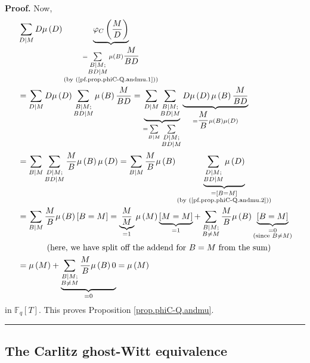\documentclass[numbers=enddot,12pt,final,onecolumn,notitlepage]{scrartcl}%
\theoremstyle{definition}
\newenvironment{proof}[1][Proof]{\noindent\textbf{#1.} }{\ \rule{0.5em}{0.5em}}
\let\sumnonlimits\sum
\renewcommand{\sum}{\sumnonlimits\limits}
\begin{document}
\begin{proof}
Now,%
\begin{align*}
&  \sum_{D\mid M}D\mu\left(  D\right)  \underbrace{\varphi_{C}\left(
\dfrac{M}{D}\right)  }_{\substack{=\sum_{\substack{B\mid M;\\BD\mid M}%
}\mu\left(  B\right)  \dfrac{M}{BD}\\\text{(by (\ref{pf.prop.phiC-Q.andmu.1}%
))}}}\\
&  =\sum_{D\mid M}D\mu\left(  D\right)  \sum_{\substack{B\mid M;\\BD\mid
M}}\mu\left(  B\right)  \dfrac{M}{BD}=\underbrace{\sum_{D\mid M}%
\sum_{\substack{B\mid M;\\BD\mid M}}}_{=\sum_{B\mid M}\sum_{\substack{D\mid
M;\\BD\mid M}}}\underbrace{D\mu\left(  D\right)  \mu\left(  B\right)
\dfrac{M}{BD}}_{=\dfrac{M}{B}\mu\left(  B\right)  \mu\left(  D\right)  }\\
&  =\sum_{B\mid M}\sum_{\substack{D\mid M;\\BD\mid M}}\dfrac{M}{B}\mu\left(
B\right)  \mu\left(  D\right)  =\sum_{B\mid M}\dfrac{M}{B}\mu\left(  B\right)
\underbrace{\sum_{\substack{D\mid M;\\BD\mid M}}\mu\left(  D\right)
}_{\substack{=\left[  B=M\right]  \\\text{(by (\ref{pf.prop.phiC-Q.andmu.2}%
))}}}\\
&  =\sum_{B\mid M}\dfrac{M}{B}\mu\left(  B\right)  \left[  B=M\right]
=\underbrace{\dfrac{M}{M}}_{=1}\mu\left(  M\right)  \underbrace{\left[
M=M\right]  }_{=1}+\sum_{\substack{B\mid M;\\B\neq M}}\dfrac{M}{B}\mu\left(
B\right)  \underbrace{\left[  B=M\right]  }_{\substack{=0\\\text{(since }B\neq
M\text{)}}}\\
&  \ \ \ \ \ \ \ \ \ \ \left(  \text{here, we have split off the addend for
}B=M\text{ from the sum}\right) \\
&  =\mu\left(  M\right)  +\underbrace{\sum_{\substack{B\mid M;\\B\neq
M}}\dfrac{M}{B}\mu\left(  B\right)  0}_{=0}=\mu\left(  M\right)
\end{align*}
in $\mathbb{F}_{q}\left[  T\right]  $. This proves Proposition
\ref{prop.phiC-Q.andmu}.
\end{proof}

\subsection{The Carlitz ghost-Witt equivalence}
\end{document}
